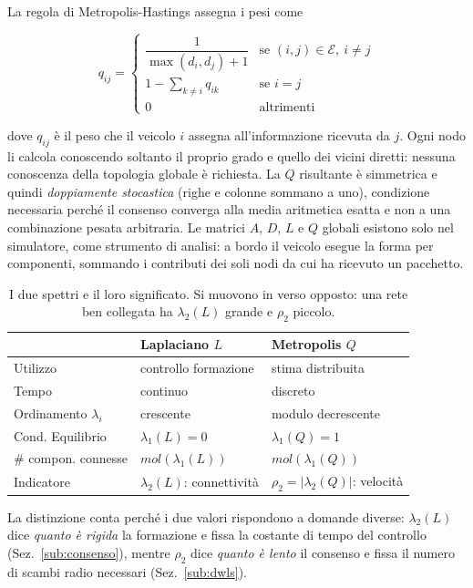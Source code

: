 \documentclass[conference,9pt]{IEEEtran}
\begin{document}
La regola di Metropolis-Hastings \cite{xiao2004} assegna i pesi come

\begin{equation}
q_{ij} =
\begin{cases}
\dfrac{1}{\max(d_i,d_j)+1} & \text{se } (i,j) \in \mathcal{E},\ i \neq j\\[1.5ex]
1 - \sum_{k \neq i} q_{ik} & \text{se } i = j\\[0.5ex]
0 & \text{altrimenti}
\end{cases}
\label{eq:metropolis}
\end{equation}

dove $q_{ij}$ \`e il peso che il veicolo $i$ assegna all'informazione ricevuta
da $j$. Ogni nodo li calcola conoscendo soltanto il proprio grado e quello dei
vicini diretti: nessuna conoscenza della topologia globale \`e richiesta.
La $Q$ risultante \`e simmetrica e quindi \emph{doppiamente stocastica} (righe
e colonne sommano a uno), condizione necessaria perch\'e il consenso converga
alla media aritmetica esatta e non a una combinazione pesata arbitraria. Le
matrici $A$, $D$, $L$ e $Q$ globali esistono solo nel simulatore, come
strumento di analisi: a bordo il veicolo esegue la forma per componenti,
sommando i contributi dei soli nodi da cui ha ricevuto un pacchetto.

\begin{table}[t]
\centering
\caption{I due spettri e il loro significato. Si muovono in verso opposto:
una rete ben collegata ha $\lambda_2(L)$ grande e $\rho_2$ piccolo.}
\label{tab:spettri}
\begin{tabular}{lll}
\toprule
 & \textbf{Laplaciano $L$} & \textbf{Metropolis $Q$}\\
\midrule
Utilizzo      & controllo formazione & stima distribuita\\
Tempo          & continuo             & discreto\\
Ordinamento $\lambda_i$    & crescente            & modulo decrescente\\
Cond. Equilibrio & $\lambda_1(L)=0$   & $\lambda_1(Q)=1$\\
\# compon. connesse & $mol(\lambda_1(L))$   & $mol(\lambda_1(Q))$\\
Indicatore     & $\lambda_2(L)$: connettivit\`a & $\rho_2=|\lambda_2(Q)|$: velocit\`a\\
\bottomrule
\end{tabular}
\end{table}

La distinzione conta perch\'e i due valori rispondono a domande diverse:
$\lambda_2(L)$ dice \emph{quanto \`e rigida} la formazione e fissa la costante
di tempo del controllo (Sez.~\ref{sub:consenso}), mentre $\rho_2$ dice
\emph{quanto \`e lento} il consenso e fissa il numero di scambi radio necessari
(Sez.~\ref{sub:dwls}).
\end{document}
